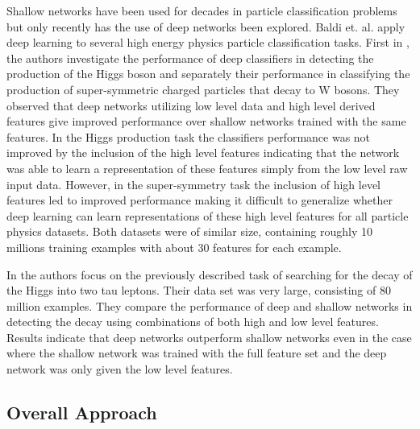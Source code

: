 \documentclass[12pt,letterpaper]{article}
\begin{document}
Shallow networks have been used for decades in particle classification problems but only recently has the use of deep networks been explored.  Baldi et. al. \cite{Baldi:2014kfa}\cite{Baldi:2014pta} apply deep learning to several high energy physics particle classification tasks.  First in \cite{Baldi:2014kfa}, the authors investigate the performance of deep classifiers in detecting the production of the Higgs boson and separately their performance in classifying the production of super-symmetric charged particles that decay to W bosons.  They observed that deep networks utilizing low level data and high level derived features give improved performance over shallow networks trained with the same features.  In the Higgs production task the classifiers performance was not improved by the inclusion of the high level features indicating that the network was able to learn a representation of these features simply from the low level raw input data.  However, in the super-symmetry task the inclusion of high level features led to improved performance making it difficult to generalize whether deep learning can learn representations of these high level features for all particle physics datasets.  Both datasets were of similar size, containing roughly 10 millions training examples with about 30 features for each example.  

In \cite{Baldi:2014pta} the authors focus on the previously described task of searching for the decay of the Higgs into two tau leptons.  Their data set was very large, consisting of 80 million examples. They compare the performance of deep and shallow networks in detecting the decay using combinations of both high and low level features.  Results indicate that deep networks outperform shallow networks even in the case where the shallow network was trained with the full feature set and the deep network was only given the low level features.

\subsection{Overall Approach}
\end{document}
